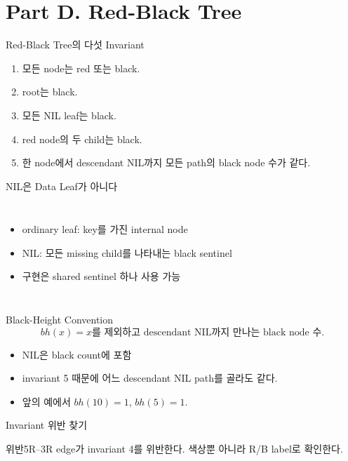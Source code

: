 \section{Part D. Red-Black Tree}
\begin{frame}{Red-Black Tree의 다섯 Invariant}
\small\begin{enumerate}
\item 모든 node는 red 또는 black.
\item root는 black.
\item 모든 NIL leaf는 black.
\item red node의 두 child는 black.
\item 한 node에서 descendant NIL까지 모든 path의 black node 수가 같다.
\end{enumerate}
\end{frame}
\begin{frame}{NIL은 Data Leaf가 아니다}
\begin{columns}\centering
{}
\begin{itemize}\item ordinary leaf: key를 가진 internal node\item NIL: 모든 missing child를 나타내는 black sentinel\item 구현은 shared sentinel 하나 사용 가능\end{itemize}
\end{columns}
\end{frame}
\begin{frame}{Black-Height Convention}
\[
bh(x)=x\text{를 제외하고 descendant NIL까지 만나는 black node 수}.
\]
\begin{itemize}\item NIL은 black count에 포함\item invariant 5 때문에 어느 descendant NIL path를 골라도 같다.\item 앞의 예에서 $bh(10)=1$, $bh(5)=1$.\end{itemize}
\end{frame}
\begin{frame}{Invariant 위반 찾기}
\centering{}
\begin{alertblock}{위반}5R–3R edge가 invariant 4를 위반한다. 색상뿐 아니라 R/B label로 확인한다.\end{alertblock}
\end{frame}

